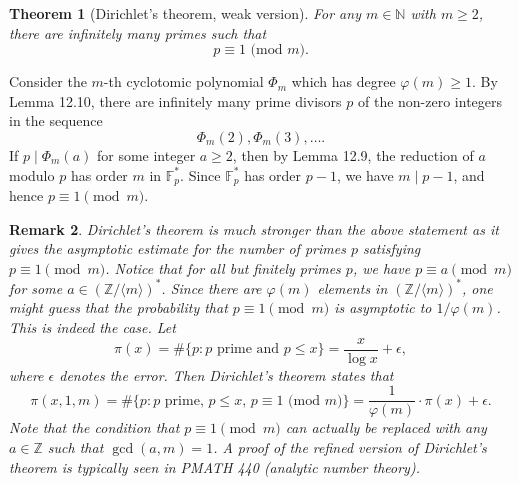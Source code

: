 \documentclass[10pt]{article}
\makeatletter
\newcommand{\N}{\mathbb{N}}
\newcommand{\Z}{\mathbb{Z}}
\newcommand{\F}{\mathbb{F}}
\theoremstyle{newstyle}
\newtheorem{thm}{Theorem}[section]
\newtheorem{remark}[thm]{Remark}
\newenvironment{pf}[1][\proofname]{\par
  \pushQED{\qed}%
  \normalfont \topsep0\p@\relax
  \trivlist
  \item[\hskip\labelsep\scshape
  #1\@addpunct{.}]\ignorespaces
}{%
  \popQED\endtrivlist\@endpefalse
}
\makeatother
\begin{document}
\begin{thm}[Dirichlet's theorem, weak version]
For any $m \in \N$ with $m \geq 2$, there are infinitely many primes such that 
\[ p \equiv 1 \text{ (mod $m$)}. \]
\end{thm}
\begin{pf}
Consider the $m$-th cyclotomic polynomial $\Phi_m$ which has degree $\varphi(m) \geq 1$. 
By Lemma 12.10, there are infinitely many prime divisors $p$ of the non-zero integers in the 
sequence 
\[ \Phi_m(2), \Phi_m(3), \dots. \]
If $p \mid \Phi_m(a)$ for some integer $a \geq 2$, then by Lemma 12.9, the reduction of $a$ 
modulo $p$ has order $m$ in $\F_p^*$. Since $\F_p^*$ has order $p-1$, we have $m \mid p-1$, 
and hence $p \equiv 1 \pmod m$. 
\end{pf}

\begin{remark}
Dirichlet's theorem is much stronger than the above statement as it gives the 
asymptotic estimate for the number of primes $p$ satisfying $p \equiv 1 \pmod m$. Notice that for all 
but finitely primes $p$, we have $p \equiv a \pmod m$ for some $a \in (\Z/\langle m \rangle)^*$. Since 
there are $\varphi(m)$ elements in $(\Z/\langle m \rangle)^*$, one might guess that the 
probability that $p \equiv 1 \pmod m$ is asymptotic to $1/\varphi(m)$. This is indeed the case. 
Let 
\[ \pi(x) = \#\{p : p \text{ prime and } p \leq x\} = \frac{x}{\log x} + \epsilon, \]
where $\epsilon$ denotes the error. Then Dirichlet's theorem states that 
\[ \pi(x, 1, m) = \#\{p : p \text{ prime},\, p \leq x,\, p \equiv 1 \text{ (mod $m$)}\} 
= \frac1{\varphi(m)} \cdot \pi(x) + \epsilon. \]
Note that the condition that $p \equiv 1 \pmod m$ can actually be replaced with any $a \in \Z$ such that 
$\gcd(a, m) = 1$. A proof of the refined version of Dirichlet's theorem is typically seen in 
PMATH 440 (analytic number theory). 
\end{remark}
\end{document}
